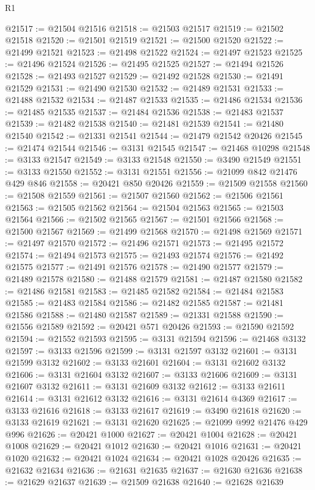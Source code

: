 \begin{lexlean}{R1}
\begin{coremodule}
@21517 := @21504 @21516
@21518 := @21503 @21517
@21519 := @21502 @21518
@21520 := @21501 @21519
@21521 := @21500 @21520
@21522 := @21499 @21521
@21523 := @21498 @21522
@21524 := @21497 @21523
@21525 := @21496 @21524
@21526 := @21495 @21525
@21527 := @21494 @21526
@21528 := @21493 @21527
@21529 := @21492 @21528
@21530 := @21491 @21529
@21531 := @21490 @21530
@21532 := @21489 @21531
@21533 := @21488 @21532
@21534 := @21487 @21533
@21535 := @21486 @21534
@21536 := @21485 @21535
@21537 := @21484 @21536
@21538 := @21483 @21537
@21539 := @21482 @21538
@21540 := @21481 @21539
@21541 := @21480 @21540
@21542 := @21331 @21541
@21544 := @21479 @21542 @20426
@21545 := @21474 @21544
@21546 := @3131 @21545
@21547 := @21468 @10298
@21548 := @3133 @21547
@21549 := @3133 @21548
@21550 := @3490 @21549
@21551 := @3133 @21550
@21552 := @3131 @21551
@21556 := @21099 @842 @21476 @429 @846
@21558 := @20421 @850 @20426
@21559 := @21509 @21558
@21560 := @21508 @21559
@21561 := @21507 @21560
@21562 := @21506 @21561
@21563 := @21505 @21562
@21564 := @21504 @21563
@21565 := @21503 @21564
@21566 := @21502 @21565
@21567 := @21501 @21566
@21568 := @21500 @21567
@21569 := @21499 @21568
@21570 := @21498 @21569
@21571 := @21497 @21570
@21572 := @21496 @21571
@21573 := @21495 @21572
@21574 := @21494 @21573
@21575 := @21493 @21574
@21576 := @21492 @21575
@21577 := @21491 @21576
@21578 := @21490 @21577
@21579 := @21489 @21578
@21580 := @21488 @21579
@21581 := @21487 @21580
@21582 := @21486 @21581
@21583 := @21485 @21582
@21584 := @21484 @21583
@21585 := @21483 @21584
@21586 := @21482 @21585
@21587 := @21481 @21586
@21588 := @21480 @21587
@21589 := @21331 @21588
@21590 := @21556 @21589
@21592 := @20421 @571 @20426
@21593 := @21590 @21592
@21594 := @21552 @21593
@21595 := @3131 @21594
@21596 := @21468 @3132
@21597 := @3133 @21596
@21599 := @3131 @21597 @3132
@21601 := @3131 @21599 @3132
@21602 := @3133 @21601
@21604 := @3131 @21602 @3132
@21606 := @3131 @21604 @3132
@21607 := @3133 @21606
@21609 := @3131 @21607 @3132
@21611 := @3131 @21609 @3132
@21612 := @3133 @21611
@21614 := @3131 @21612 @3132
@21616 := @3131 @21614 @4369
@21617 := @3133 @21616
@21618 := @3133 @21617
@21619 := @3490 @21618
@21620 := @3133 @21619
@21621 := @3131 @21620
@21625 := @21099 @992 @21476 @429 @996
@21626 := @20421 @1000
@21627 := @20421 @1004
@21628 := @20421 @1008
@21629 := @20421 @1012
@21630 := @20421 @1016
@21631 := @20421 @1020
@21632 := @20421 @1024
@21634 := @20421 @1028 @20426
@21635 := @21632 @21634
@21636 := @21631 @21635
@21637 := @21630 @21636
@21638 := @21629 @21637
@21639 := @21509 @21638
@21640 := @21628 @21639

\end{coremodule}
\end{lexlean}
